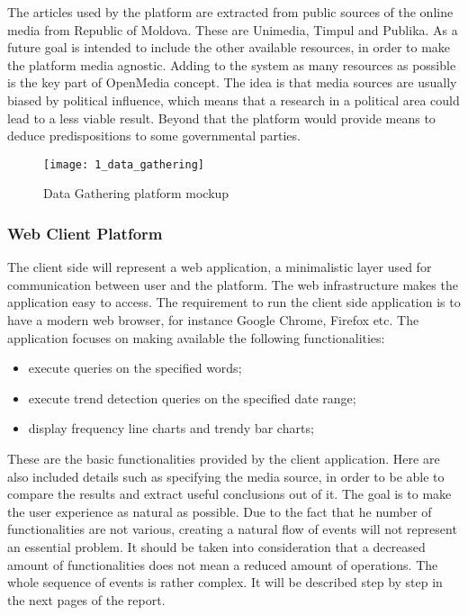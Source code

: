 The articles used by the platform are extracted from public sources of the online media from Republic of Moldova. These are Unimedia, Timpul and Publika. As a future goal is intended to include the other available resources, in order to make the platform media agnostic. Adding to the system as many resources as possible is the key part of OpenMedia concept. The idea is that media sources are usually biased by political influence, which means that a research in a political area could lead to a less viable result. Beyond that the platform would provide means to deduce predispositions to some governmental parties.

\begin{figure}[!ht]
\centering
\texttt{[image: 1\_data\_gathering]}
\caption{Data Gathering platform mockup}\label{data_gathering_mock}
\end{figure}

\subsubsection{Web Client Platform}
The client side will represent a web application, a minimalistic layer used for communication between user and the platform. The web infrastructure makes the application easy to access. The requirement to run the client side application is to have a modern web browser, for instance Google Chrome, Firefox etc. The application focuses on making available the following functionalities:
\begin{itemize}
    \item execute queries on the specified words;
    \item execute trend detection queries on the specified date range;
    \item display frequency line charts and trendy bar charts;
\end{itemize}

These are the basic functionalities provided by the client application. Here are also included details such as specifying the media source, in order to be able to compare the results and extract useful conclusions out of it. The goal is to make the user experience as natural as possible. Due to the fact that he number of functionalities are not various, creating a natural flow of events will not represent an essential problem. It should be taken into consideration that a decreased amount of functionalities does not mean a reduced amount of operations. The whole sequence of events is rather complex. It will be described step by step in the next pages of the report.

